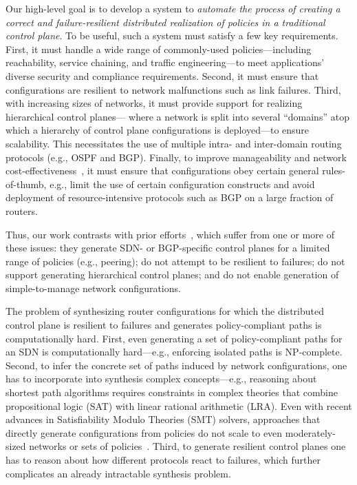 Our high-level goal is to develop a system to {\em automate the
  process of creating a correct and failure-resilient distributed
  realization of policies in a traditional control plane}. To be
useful, such a system must satisfy a few key requirements. First, it
must handle a wide range of commonly-used policies---including
reachability, service chaining, and traffic engineering---to meet
applications' diverse security and compliance requirements. Second, it
must ensure that configurations are resilient to network malfunctions
such as link failures. Third, with increasing sizes of networks, it
must provide support for realizing hierarchical control planes---
where a network is split into several ``domains'' atop which a
hierarchy of control plane configurations is deployed---to ensure
scalability. This necessitates the use of multiple intra- and
inter-domain routing protocols (e.g., OSPF and BGP). Finally, to
improve manageability and network
cost-effectiveness~\cite{mpa:imc15,complexity:sigcomm11}, it must
ensure that configurations obey certain general rules-of-thumb, e.g.,
limit the use of certain configuration constructs and avoid deployment
of resource-intensive protocols such as BGP on a large fraction of
routers.


Thus, our work contrasts with prior efforts~\cite{netegg, propane,
  merlin, simple, fattire, netkat, netkatcompiler, sol}, which suffer
from one or more of these issues: they generate SDN- or BGP-specific
control planes for a limited range of policies (e.g., peering); do not
attempt to be resilient to failures; do not support generating
hierarchical control planes; and do not enable generation of
simple-to-manage network configurations. 

The problem of synthesizing router configurations for which the
distributed control plane is resilient to failures and generates
policy-compliant paths is computationally hard.  First, even
generating a set of policy-compliant paths for an SDN is
computationally hard---e.g., enforcing isolated paths is NP-complete.
Second, to infer the concrete set of paths induced by network
configurations, one has to incorporate into synthesis complex
concepts---e.g., reasoning about shortest path algorithms requires
constraints in complex theories that combine propositional logic (SAT)
with linear rational arithmetic (LRA). Even with recent advances in
Satisfiability Modulo Theories (SMT) solvers, approaches that directly
generate configurations from policies do not scale to even
moderately-sized networks or sets of policies~\cite{synet}.  Third, to
generate resilient control planes one has to reason about how
different protocols react to failures, which further complicates an
already intractable synthesis problem.


